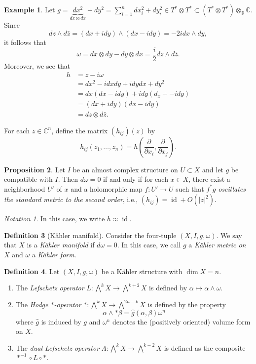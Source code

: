 \documentclass[10pt,letterpaper,cm]{nupset}
\theoremstyle{definition}
\newtheorem{defn}{Definition}[subsection]
\newtheorem{exmp}[defn]{Example}
\theoremstyle{theorem}
\newtheorem{prop}[defn]{Proposition}
\theoremstyle{remark}
\newtheorem*{notation}{Notation}
\newcommand{\C}{\mathbb C}
\newcommand{\R}{\mathbb{R}}
\newcommand{\1}{\mathbb{1}}
\newcommand{\0}{\vec 0}
\DeclareMathOperator{\id}{id}
\newcommand{\be}{\begin{enumerate}}
\newcommand{\ee}{\end{enumerate}}
\begin{document}
\begin{exmp}
Let $g = \underbrace{d{x^2}}_{d{x}\otimes d{x}} + d{y^2} = \sum_{i=1}^nd{x_i^2} + d{y_i^2} \in T^{\ast}\otimes T^{\ast} \subset \left(T^{\ast}\otimes T^{\ast}\right)\otimes_{\R}\C$. Since
\[
d{z} \wedge d{\bar{z}} = \left(d{x} + id{y}\right) \wedge \left(d{x}- id{y}\right) = {-2id{x}}\wedge d{y}
,\]
it follows that
\[
\omega = d{x}\otimes d{y} -d{y}\otimes d{x} = \frac{i}{2}d{z} \wedge d{\bar{z}}
.\] Moreover, we see that
\begin{align*}
h & = z-i{\omega}
\\ & = d{x^2} -id{x}d{y} +id{y}d{x} +d{y}^2
\\ & = d{x}\left(d{x}-id{y}\right) + id{y}\left(d_x+-id{y}\right)
\\ & = \left(d{x} + id{y}\right)\left(d{x}-id{y}\right) 
\\ & = d{z}\otimes d{\bar{z}}.
\end{align*}
\end{exmp}

For each $z\in \C^n$, define the matrix $\left(h_{ij}\right)\left(z\right)$ by $$h_{ij}\left(z_1, \ldots, z_n\right) = h\left(\frac{\partial}{\partial{x_i}}, \frac{\partial}{\partial{x_j}}\right).$$ 

\begin{prop}
Let $I$ be an almost complex structure on $U\subset X$ and let $g$ be compatible with $I$. Then $d{\omega} =0$ if and only if for each $x\in X$, there exist a neighborhood  $U'$ of $x$ and a holomorphic map $f: U' \to U$ such that $f^{\ast}{g}$ \textit{oscillates the standard metric to the second order}, i.e., $\left(h_{ij}\right) = \id + O\left(\left\lvert{z}\right\rvert^2\right)$.
\end{prop}

\begin{notation}
In this case, we write $h \approx \id$.
\end{notation}

\begin{defn}[K\"ahler manifold]
Consider the four-tuple $\left(X, I, g, \omega\right)$.  We say that $X$ is a \textit{K\"ahler manifold} if $d{\omega}=0$. In this case, we call $g$ a \textit{K\"ahler metric on $X$} and $\omega$ a \textit{K\"ahler form}.
\end{defn}

\begin{defn}
Let $\left(X, I, g, \omega\right)$ be a K\"ahler structure with $\dim{X} =n$.
\be
\item The \textit{Lefschetz operator} $L: \bigwedge^k{X} \to \bigwedge^{k+2}{X}$ is defined by $\alpha \mapsto \alpha \wedge \omega$.
\item The \textit{Hodge $\ast$-operator} $\ast : \bigwedge^k{X} \to \bigwedge^{2n-k}{X}$  is defined by the property
\[
\alpha \wedge \ast{\beta} = \hat{g}\left(\alpha, \beta\right){\omega^n}
\] where $\hat{g}$ is induced by $g$ and $\omega^n$ denotes the (positively oriented) volume form on $X$.
\item  The \textit{dual Lefschetz operator} $\Lambda : \bigwedge^k{X} \to \bigwedge^{k-2}{X}$ is defined as the composite $\ast^{-1} \circ L\circ \ast$.
\ee
\end{defn}
\end{document}
